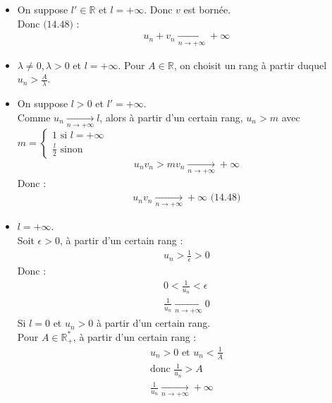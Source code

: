 \documentclass[../main.tex]{subfiles}
\begin{document}
\begin{itemize}
    \item On suppose $l' \in \mathbb{R}$ et $l = +\infty$. Donc $v$ est bornée. \\
    Donc $\text{(14.48)}$ : 
    \begin{align*}
        u_n + v_n \underset{n \to +\infty}{\longrightarrow}  +\infty
    \end{align*}

    \item $\lambda \neq 0, \lambda > 0$ et $l = +\infty$. Pour $A \in \mathbb{R}$, on choisit un rang à partir duquel $u_n > \frac{A}{\lambda}$. 
    
    \item On suppose $l > 0$ et $l' = +\infty$. \\
    Comme $u_n \underset{n \to +\infty}{\longrightarrow} l$, alors à partir d'un certain rang, $u_n > m$ avec $m = \begin{cases}
        1 \text{ si } l = +\infty \\
        \frac{l}{2} \text{ sinon}
    \end{cases}$
    \begin{align*}
        u_n v_n > m v_n \underset{n \to +\infty}{\longrightarrow} +\infty
    \end{align*}
    Donc : 
    \begin{align*}
        u_n v_n \underset{n \to +\infty}{\longrightarrow} +\infty \text{ (14.48)}
    \end{align*}

    \item $l = +\infty$. \\
    Soit $\epsilon > 0$, à partir d'un certain rang : 
    \begin{align*}
        u_n > \frac{1}{\epsilon} > 0
    \end{align*}
    Donc : 
    \begin{align*}
        0 < \frac{1}{u_n} < \epsilon \\
        \frac{1}{u_n} \underset{n \to +\infty}{\longrightarrow} 0
    \end{align*}
    Si $l = 0$ et $u_n > 0$ à partir d'un certain rang. \\
    Pour $A \in \mathbb{R}_+^*$, à partir d'un certain rang : 
    \begin{align*}
        u_n > 0 \text{ et } u_n < \frac{1}{A} \\
        \text{donc } \frac{1}{u_n} > A \\
        \frac{1}{u_n} \underset{n \to +\infty}{\longrightarrow} +\infty
    \end{align*}
\end{itemize}
\end{document}
